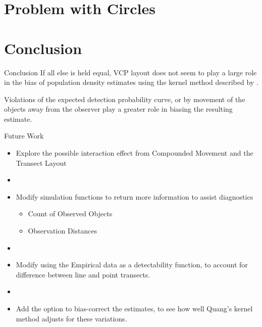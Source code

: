 \documentclass{beamer}
\begin{document}
\section{Problem with Circles}


\section{Conclusion}

\begin{frame}{Conclusion}
	If all else is held equal, VCP layout does not seem to play a large role in the bias of population density estimates using the kernel method described by \textcite{quang1993}.\par
		\vspace{1cm}
	Violations of the expected detection probability curve, or by movement of the objects away from the observer play a greater role in biasing the resulting estimate.
	
\end{frame}

\begin{frame}{Future Work}
	\begin{itemize}
	\item Explore the possible interaction effect from Compounded Movement and the Transect Layout
	\item[]
	\item Modify simulation functions to return more information to assist diagnostics
	\begin{itemize}
	\item Count of Observed Objects
	\item Observation Distances
	\end{itemize}
	\item[]
	\item Modify using the Empirical data as a detectability function, to account for difference between line and point transects.
	\item[]
	\item Add the option to bias-correct the estimates, to see how well Quang's kernel method adjusts for these variations.
	\end{itemize}
\end{frame}
\end{document}
